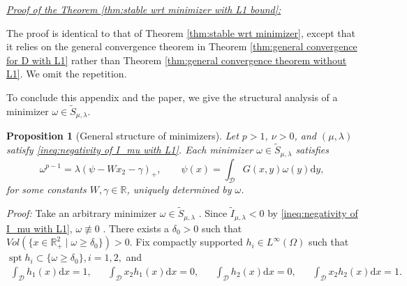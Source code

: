 \documentclass[11pt,letterpaper]{amsart}
\newtheorem{prop}[thm]{Proposition}
\theoremstyle{definition}
\theoremstyle{remark}
\newcommand{\D}{\mathcal{D}}
\newcommand{\R}{\mathbb{R}}
\newcommand{\spt}{\operatorname{spt}}
\newcommand{\eps}{\epsilon}
\numberwithin{equation}{section}
\begin{document}


\hspace*{\fill} 

\noindent\textit{\underline{Proof of the Theorem \ref{thm:stable wrt minimizer with L1 bound}: }}

The proof is identical to that of Theorem \ref{thm:stable wrt minimizer}, except that it relies on the general convergence theorem in Theorem \ref{thm:general convergence for D with L1} rather than Theorem \ref{thm:general convergence theorem without L1}.  We omit the repetition.
    
\rightline{$\Box$}

To conclude this appendix and the paper, we give the structural analysis of a minimizer $\omega \in \widetilde{S}_{\mu,\lambda}$.

\begin{prop}[General structure of minimizers]
\label{prop:general structure with L1}
Let $p>1$, $\nu>0$, and $(\mu,\lambda)$ satisfy \eqref{ineq:negativity of I_mu with L1}. Each minimizer $\omega \in \widetilde{S}_{\mu,\lambda}$ satisfies
\begin{equation}
\label{eqn:general structure of minimizer with L1}
\omega^{p-1} = \lambda(\psi -W x_{2} - \gamma)_+, \qquad 
\psi (x) = \int_{\D}G(x,y)\omega (y)\mathrm{d}y,
\end{equation}
for some constants $W, \gamma \in \R$, uniquely determined by $\omega$.
\end{prop}
\noindent\textit{Proof: }
Take an arbitrary minimizer $\omega \in \widetilde{S}_{\mu,\lambda}$ . Since $\widetilde{I}_{\mu,\lambda}< 0$ by \eqref{ineq:negativity of I_mu with L1}, $\omega\not\equiv 0$ . There exists a $\delta_{0} > 0$ such that $Vol(\{x\in \R^2_+\mid \omega \geq \delta_{0}\}) > 0$. Fix compactly supported $h_{i}\in L^{\infty}(\Omega)$ such that $\spt h_{i}\subset \{\omega \geq \delta_{0}\}, i = 1,2,$ and
\begin{align*}
    \int_{\D}h_{1}(x)\mathrm{d}x = 1, && \int_{\D}x_{2}h_{1}(x)\mathrm{d}x = 0, && 
    \int_{\D}h_{2}(x)\mathrm{d}x = 0, && \int_{\D}x_{2}h_{2}(x)\mathrm{d}x = 1.
\end{align*}
\end{document}
